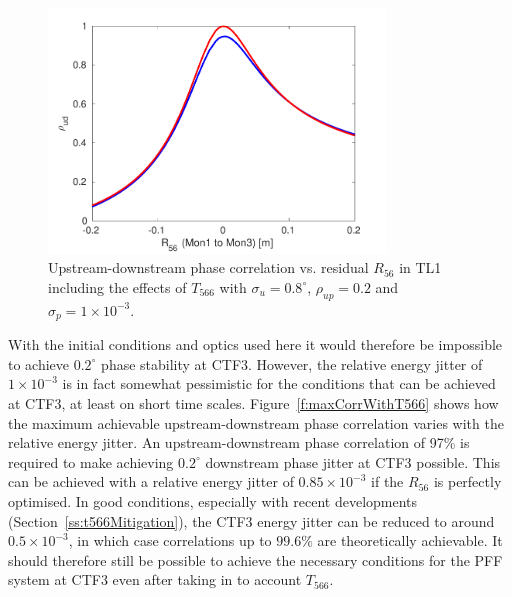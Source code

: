 \begin{figure}
  \centering
  \includegraphics[width=0.8\textwidth]{Figures/propagation/corrVsR56_t566}
  \caption{Upstream-downstream phase correlation vs. residual \(R_{56}\) in TL1 including the effects of \(T_{566}\)  with \(\sigma_u = 0.8^\circ\), \(\rho_{up}=0.2\) and \(\sigma_p = 1 \times 10^{-3}\).}
  \label{f:corrVsR56_t566}
\end{figure}

With the initial conditions and optics used here it would therefore be impossible to achieve \(0.2^\circ\) phase stability at CTF3. However, the relative energy jitter of \(1\times10^{-3}\) is in fact somewhat pessimistic for the conditions that can be achieved at CTF3, at least on short time scales. Figure~\ref{f:maxCorrWithT566} shows how the maximum achievable upstream-downstream phase correlation varies with the relative energy jitter. An upstream-downstream phase correlation of 97\% is required to make achieving \(0.2^\circ\) downstream phase jitter at CTF3 possible. This can be achieved with a relative energy jitter of \(0.85\times10^{-3}\) if the \(R_{56}\) is perfectly optimised. In good conditions, especially with recent developments (Section~\ref{ss:t566Mitigation}), the CTF3 energy jitter can be reduced to around \(0.5\times10^{-3}\), in which case correlations up to \(99.6\%\) are theoretically achievable. It should therefore still be possible to achieve the necessary conditions for the PFF system at CTF3 even after taking in to account \(T_{566}\).


